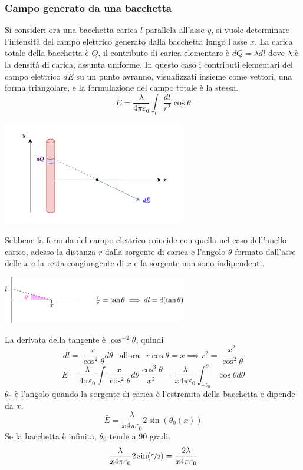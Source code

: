 \documentclass[10pt, letterpaper]{report}
\begin{document}
\subsubsection{Campo generato da una bacchetta}
Si consideri ora una bacchetta carica $l$ parallela all'asse $y$, si vuole determinare l'intensità del campo elettrico generato dalla bacchetta lungo l'asse $x$. La carica totale della bacchetta è $Q$, il contributo di carica elementare è $dQ=\lambda dl$ dove $\lambda$ è la densità di carica, assunta uniforme.\acc 
In questo caso i contributi elementari del campo elettrico $d\bar E$ su un punto avranno, visualizzati insieme come vettori, una forma triangolare, e la formulazione del campo totale è la stessa. 
$$ \bar E = \frac{\lambda}{4\pi\varepsilon_0}\int_l\frac{dl}{r^2}\cos\theta$$
\begin{center}
    \includegraphics[width=0.6\textwidth]{images/bacchettaCarica.pdf}
\end{center}
Sebbene la formula del campo elettrico coincide con quella nel caso dell'anello carico, adesso la distanza $r$ dalla sorgente di carica e l'angolo $\theta$ formato dall'asse delle $x$ e la retta congiungente di  $x$ e la sorgente non sono indipendenti.
\begin{center}
    \includegraphics[width=0.6\textwidth]{images/tan.eps}
\end{center}
La derivata della tangente è $\cos^{-2}\theta$, quindi $$ dl=\frac{x}{\cos^2\theta}d\theta
\ \ \text{ allora } \ \ 
 r\cos\theta=x\implies r^2=\frac{x^2}{\cos^2\theta}$$
$$ \bar E = \frac{\lambda}{4\pi\varepsilon_0}\int \frac{x}{\cos^2\theta}d\theta\frac{\cos^3\theta}{x^2}=\frac{\lambda}{x4\pi\varepsilon_0}\int_{-\theta_0}^{\theta_0}\cos\theta d\theta$$
$\theta_0$ è l'angolo quando la sorgente di carica è l'estremita della bacchetta e dipende da $x$.
$$ \bar E =\frac{\lambda}{x4\pi\varepsilon_0}2\sin(\theta_0(x)) $$
Se la bacchetta è infinita, $\theta_0$ tende a 90 gradi. 
$$ \frac{\lambda}{x4\pi\varepsilon_0}2\sin(\nicefrac{\pi}{2})=\frac{2\lambda}{x4\pi\varepsilon_0}$$
\end{document}
